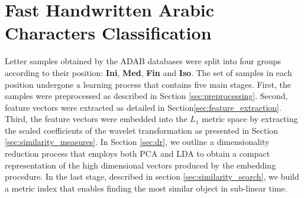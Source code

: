%
%
%
%
%
%



\chapter{Fast Handwritten Arabic Characters Classification}
\label{chap:characters_classification}

\iftoggle{edit-mode}{\hspace{0pt}\marginpar{The learning process}}{}
Letter samples obtained by the ADAB databases were split into four groups according to their position: \textbf{Ini}, \textbf{Med}, \textbf{Fin} and \textbf{Iso}. 
The set of samples in each position undergone a learning process that contains five main stages.
First, the samples were preprocessed as described in Section \ref{sec:preprocessing}.
Second, feature vectors were extracted as detailed in Section\ref{sec:feature_extraction}.
Third, the feature vectors were embedded into the $L_1$ metric space by extracting the scaled coefficients of the wavelet transformation as presented in Section \ref{sec:similarity_measures}. 
In Section \ref{sec:dr}, we outline a dimensionality reduction process that employs both PCA and LDA to obtain a compact representation of the high dimensional vectors produced by the embedding procedure.
In the last stage, described in section \ref{sec:similarity_search}, we build a metric index that enables finding the most similar object in sub-linear time.

